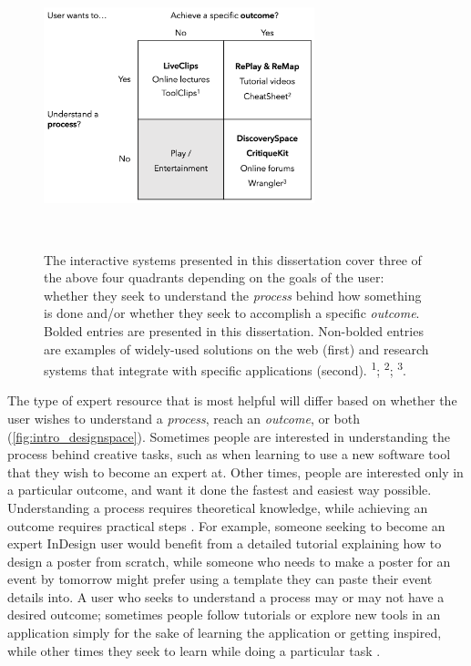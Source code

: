 \begin{figure}[b!]
\centering
  \includegraphics[width=0.7\textwidth]{figures/designspace.png}
  \caption[The interactive systems presented in this dissertation cover three of the above four quadrants depending on the goals of the user: whether they seek to understand the \textit{process} behind how something is done and/or whether they seek to accomplish a specific \textit{outcome}.]{The interactive systems presented in this dissertation cover three of the above four quadrants depending on the goals of the user: whether they seek to understand the \textit{process} behind how something is done and/or whether they seek to accomplish a specific \textit{outcome}. Bolded entries are presented in this dissertation. Non-bolded entries are examples of widely-used solutions on the web (first) and research systems that integrate with specific applications (second). \textsuperscript{1}\cite{Grossman2010a}; \textsuperscript{2}\cite{Vermette2015}; \textsuperscript{3}\cite{Kandel2011}.}~\label{fig:intro_designspace}
\end{figure}

The type of expert resource that is most helpful will differ based on whether the user wishes to understand a  \textit{process}, reach an \textit{outcome}, or both (\autoref{fig:intro_designspace}). Sometimes people are interested in understanding the process behind creative tasks, such as when learning to use a new software tool that they wish to become an expert at. Other times, people are interested only in a particular outcome, and want it done the fastest and easiest way possible. Understanding a process requires theoretical knowledge, while achieving an outcome requires practical steps \cite{Procida2017}. For example, someone seeking to become an expert InDesign user would benefit from a detailed tutorial explaining how to design a poster from scratch, while someone who needs to make a poster for an event by tomorrow might prefer using a template they can paste their event details into. A user who seeks to understand a process may or may not have a desired outcome; sometimes people follow tutorials or explore new tools in an application simply for the sake of learning the application or getting inspired, while other times they seek to learn while doing a particular task \cite{Lafreniere2013a, Procida2017}.

